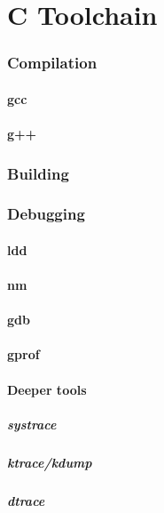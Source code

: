 \chapter {C Toolchain}

\subsection{Compilation}
\subsubsection{gcc}
\subsubsection{g++}
\subsection{Building}


\subsection{Debugging}
\subsubsection{ldd}
\subsubsection{nm}
\subsubsection{gdb}
\subsubsection{gprof}
\subsubsection{Deeper tools}
\paragraph{systrace}
\paragraph{ktrace/kdump}
\paragraph{dtrace}
